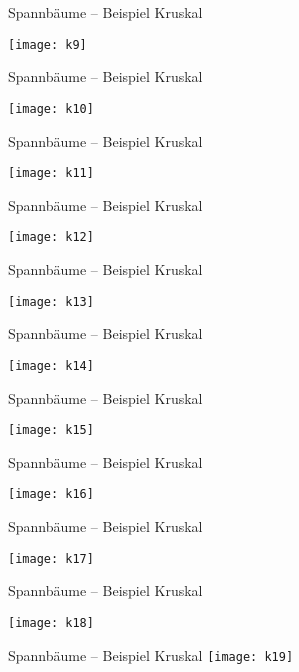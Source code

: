 \begin{frame}{Spannbäume – Beispiel Kruskal}
	
		\centering
		\texttt{[image: k9]}
	
\end{frame}

\begin{frame}{Spannbäume – Beispiel Kruskal}
	
		\centering
		\texttt{[image: k10]}
	
\end{frame}

\begin{frame}{Spannbäume – Beispiel Kruskal}
	
		\centering
		\texttt{[image: k11]}
	
\end{frame}

\begin{frame}{Spannbäume – Beispiel Kruskal}
	
		\centering
		\texttt{[image: k12]}
	
\end{frame}

\begin{frame}{Spannbäume – Beispiel Kruskal}
	
		\centering
		\texttt{[image: k13]}
	
\end{frame}

\begin{frame}{Spannbäume – Beispiel Kruskal}
	
		\centering
		\texttt{[image: k14]}
	
\end{frame}

\begin{frame}{Spannbäume – Beispiel Kruskal}
	
		\centering
		\texttt{[image: k15]}
	
\end{frame}

\begin{frame}{Spannbäume – Beispiel Kruskal}
	
		\centering
		\texttt{[image: k16]}
	
\end{frame}

\begin{frame}{Spannbäume – Beispiel Kruskal}
	
		\centering
		\texttt{[image: k17]}
	
\end{frame}

\begin{frame}{Spannbäume – Beispiel Kruskal}
	
		\centering
		\texttt{[image: k18]}
	
\end{frame}

\begin{frame}{{\hypertarget{label:afterEx2}{}Spannbäume – Beispiel Kruskal}}
		\centering
		\texttt{[image: k19]}
\end{frame}
